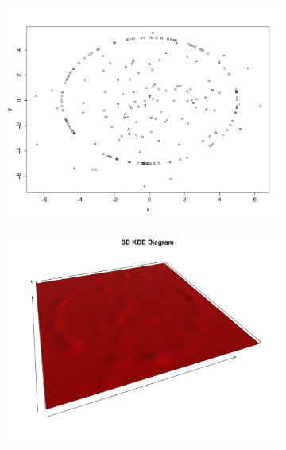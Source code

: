 \documentclass[a4paper]{article}
\begin{document}
\begin{figure}[htp!]
\centering
\begin{subfigure}{.32\textwidth}
  \centering
  \includegraphics[width=\linewidth]{noisycircle1b}
\end{subfigure}%
\begin{subfigure}{.32\textwidth}
  \centering
  \includegraphics[width=\linewidth]{noisycircle3b}
\end{subfigure}%
\begin{subfigure}{.32\textwidth}
  \centering

\end{subfigure}
\end{figure}
\end{document}
